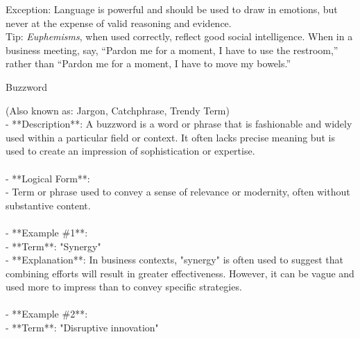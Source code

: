 \documentclass[a4paper,12pt,single,pdftex]{scrartcl}
\begin{document}
{    
      Exception: Language is powerful and should be used to draw in emotions, but never at the expense of valid reasoning and evidence.
    \\

    
      Tip: {\em Euphemisms}, when used correctly, reflect good social intelligence. When in a business meeting, say, “Pardon me for a moment, I have to use the restroom,” rather than “Pardon me for a moment, I have to move my bowels.”
    \\

  }


Buzzword
    
      (Also known as: Jargon, Catchphrase, Trendy Term)
    \\

  
    
      - **Description**: A buzzword is a word or phrase that is fashionable and widely used within a particular field or context. It often lacks precise meaning but is used to create an impression of sophistication or expertise.
    \\

    
      
    \\

    
      - **Logical Form**:
    \\

    
        - Term or phrase used to convey a sense of relevance or modernity, often without substantive content.
    \\

    
      
    \\

    
      - **Example \#1**:
    \\

    
        - **Term**: "Synergy"
    \\

    
        - **Explanation**: In business contexts, "synergy" is often used to suggest that combining efforts will result in greater effectiveness. However, it can be vague and used more to impress than to convey specific strategies.
    \\

    
      
    \\

    
      - **Example \#2**:
    \\

    
        - **Term**: "Disruptive innovation"
    \\
\end{document}
